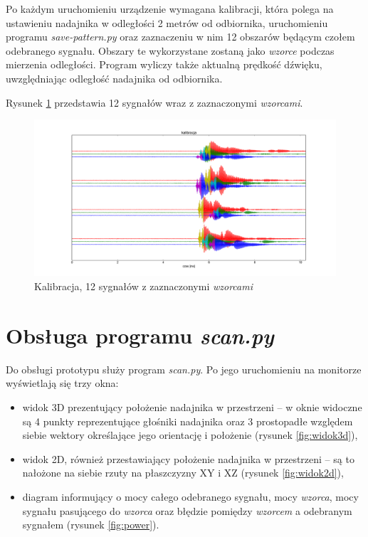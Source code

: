 Po każdym uruchomieniu urządzenie wymagana kalibracji,
która polega na ustawieniu nadajnika w odległości 2 metrów od odbiornika,
uruchomieniu programu \textit{save-pattern.py} oraz zaznaczeniu w nim 12 obszarów  będącym czołem odebranego sygnału.
Obszary te wykorzystane zostaną jako \textit{wzorce} podczas mierzenia odległości.
Program wyliczy także aktualną prędkość dźwięku, uwzględniając odległość nadajnika od odbiornika.

Rysunek \ref{fig:kalibracja_12x} przedstawia 12 sygnałów wraz z zaznaczonymi \textit{wzorcami}.


 \begin{figure}[ht]
    \centering
    \includegraphics[width=1.0\textwidth, trim= 50mm 0mm 40mm 0mm,clip]{kalibracja_12x}
    \caption{Kalibracja, 12 sygnałów z zaznaczonymi \textit{wzorcami}}
    \label{fig:kalibracja_12x}
\end{figure}

\newpage

\section{Obsługa programu \textit{scan.py}}

Do obsługi prototypu służy program \textit{scan.py}. Po jego uruchomieniu 
na monitorze wyświetlają się trzy okna: 
\begin{itemize}
 \item widok 3D prezentujący położenie nadajnika w przestrzeni -- w oknie widoczne są  
 4 punkty reprezentujące głośniki nadajnika oraz 3 prostopadłe względem siebie wektory określające 
jego orientację i położenie (rysunek \ref{fig:widok3d}),
 \item widok 2D, również przestawiający położenie nadajnika w przestrzeni --
 są to nałożone na siebie rzuty na płaszczyzny XY i XZ
 (rysunek \ref{fig:widok2d}),
 \item diagram informujący o mocy całego odebranego sygnału, mocy \textit{wzorca}, mocy sygnału pasującego do \textit{wzorca} 
 oraz błędzie pomiędzy \textit{wzorcem} a odebranym sygnałem (rysunek \ref{fig:power}).
\end{itemize}

